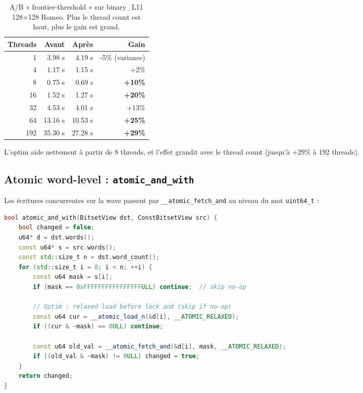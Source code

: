 \begin{table}[H]
\centering
\begin{tabular}{rrrr}
\toprule
\textbf{Threads} & \textbf{Avant} & \textbf{Après} & \textbf{Gain} \\
\midrule
1 & 3.98 s & 4.19 s & -5\% (variance) \\
4 & 1.17 s & 1.15 s & +2\% \\
8 & 0.75 s & 0.69 s & \textbf{+10\%} \\
16 & 1.52 s & 1.27 s & \textbf{+20\%} \\
32 & 4.53 s & 4.01 s & +13\% \\
64 & 13.16 s & 10.53 s & \textbf{+25\%} \\
192 & 35.30 s & 27.28 s & \textbf{+29\%} \\
\bottomrule
\end{tabular}
\caption{A/B « frontier-threshold » sur binary\_L11 128×128 Romeo. Plus le thread count est haut, plus le gain est grand.}
\label{tab:omp:frontier_threshold}
\end{table}

L'optim aide nettement à partir de 8 threads, et l'effet grandit avec le thread count (jusqu'à +29\% à 192 threads).

\subsection{Atomic word-level : \texttt{atomic\_and\_with}}

Les écritures concurrentes sur la wave passent par \texttt{\_\_atomic\_fetch\_and} au niveau du mot \texttt{uint64\_t} :

\begin{lstlisting}[language=C++]
bool atomic_and_with(BitsetView dst, ConstBitsetView src) {
    bool changed = false;
    u64* d = dst.words();
    const u64* s = src.words();
    const std::size_t n = dst.word_count();
    for (std::size_t i = 0; i < n; ++i) {
        const u64 mask = s[i];
        if (mask == 0xFFFFFFFFFFFFFFFFULL) continue;  // skip no-op

        // Optim : relaxed load before lock and (skip if no-op)
        const u64 cur = __atomic_load_n(&d[i], __ATOMIC_RELAXED);
        if ((cur & ~mask) == 0ULL) continue;

        const u64 old_val = __atomic_fetch_and(&d[i], mask, __ATOMIC_RELAXED);
        if ((old_val & ~mask) != 0ULL) changed = true;
    }
    return changed;
}
\end{lstlisting}

